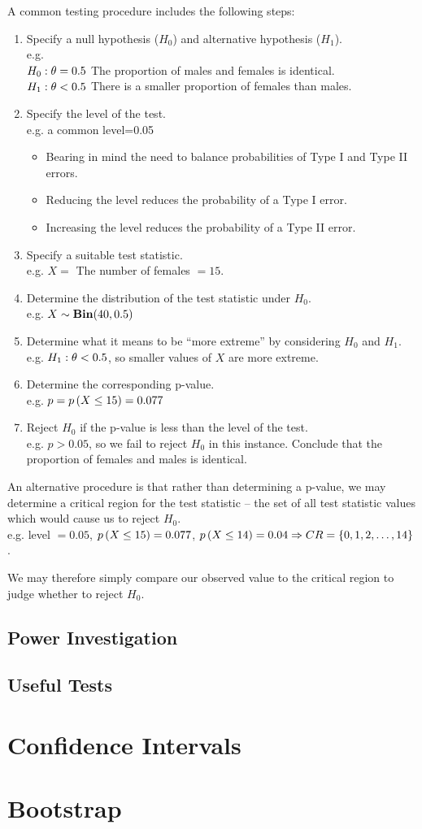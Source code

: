 A common testing procedure includes the following steps:
	\begin{enumerate}
		\item Specify a null hypothesis ($H_0$) and alternative hypothesis ($H_1$). \\ e.g. \\
		$H_0:\theta=0.5$ The proportion of males and females is identical. \\
		$H_1:\theta<0.5$ There is a smaller proportion of females than males.
		\item Specify the level of the test. \\ e.g. a common level=0.05
		\begin{itemize}[leftmargin=0.4cm,nosep]
			\item Bearing in mind the need to balance probabilities of Type I and Type II errors.
			\item Reducing the level reduces the probability of a Type I error.
			\item Increasing the level reduces the probability of a Type II error.
		\end{itemize}
		\item Specify a suitable test statistic. \\ e.g. $X=$ The number of females $=15$.
		\item Determine the distribution of the test statistic under $H_0$. \\ e.g. $X\sim\mathbf{Bin}(40,0.5)$
		\item Determine what it means to be ``more extreme'' by considering $H_0$ and $H_1$. \\ e.g. $H_1:\theta<0.5$, so smaller values of $X$ are more extreme.
		\item Determine the corresponding p-value. \\ e.g. $p=p\left(X\leq15\right)=0.077$
		\item Reject $H_0$ if the p-value is less than the level of the test. \\ e.g. $p>0.05$, so we fail to reject $H_0$ in this instance. Conclude that the proportion of females and males is identical.
	\end{enumerate}

An alternative procedure is that rather than determining a p-value, we may determine a critical region for the test statistic -- the set of all test statistic values which would cause us to reject $H_0$. \\ e.g. level $=0.05$, $p\left(X\leq15\right)=0.077$, $p\left(X\leq14\right)=0.04 \Rightarrow CR=\{0,1,2,\dotsc,14\}$.

We may therefore simply compare our observed value to the critical region to judge whether to reject $H_0$.

\subsection{Power Investigation}

\subsection{Useful Tests}

\section{Confidence Intervals}

\section{Bootstrap}